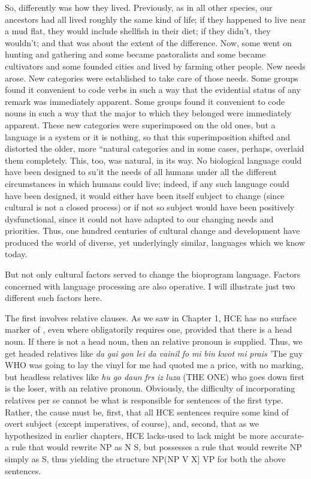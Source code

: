 So, differently was how they lived. Previously, as in all other species, our ancestors had all lived roughly the same kind of life; if they happened to live near a mud flat, they would include shellfish in their diet; if they didn't, they wouldn't; and that was about the extent of the difference. Now, some went on hunting and gathering and some became pastoralists and some became cultivators and some founded cities and lived by farming other people. New needs arose. New cate\-gories were established to take care of those needs. Some groups found it convenient to code verbs in such a way that the evidential status of any remark was immediately apparent. Some groups found it con\-venient to code nouns in such a way that the major 
to which they belonged were immediately apparent. These new cate\-gories were superimposed on the old ones, but a language is a system or it is nothing, so that this superimposition shifted and distorted the older, more ``natural categories and in some cases, perhaps, overlaid them completely. This, too, was natural, in its way. No biological language could have been designed to su'it the needs of all humans under all the different circumstances in which humans could live; indeed, if any such language could have been designed, it would either have been itself subject to change (since cultural  is not a closed process) or if not so subject would have been positively dys\-functional, since it could not have adapted to our changing needs and priorities. Thus, one hundred centuries of cultural change and develop\-ment have produced the world of diverse, yet underlyingly similar, languages which we know today.

But not only cultural factors served to change the bioprogram language. Factors concerned with language processing are also opera\-tive. I will illustrate just two different  such factors here.

The first involves relative clauses. As we saw in Chapter 1, HCE has no surface marker of , even where  obligatorily requires one, provided that there is a head noun. If there is not a head noun, then an  relative pronoun is supplied. Thus, we get headed relatives like \textit{da} \textit{gai} \textit{gon} \textit{lei} \textit{da} \textit{vainil} \textit{fo} \textit{mi} \textit{bin} \textit{kwot} \textit{mi} \textit{prais} 'The guy WHO was going to lay the vinyl for me had quoted me a price, with no marking, but headless relatives like \textit{hu} \textit{go} \textit{daun} \textit{frs} \textit{iz} \textit{luza} (THE ONE) who goes down first is the loser, with an  relative pro\-noun. Obviously, the difficulty of incorporating  relatives per se cannot be what is responsible for sentences of the first type. Rather, the cause must be, first, that all HCE sentences require some kind of overt subject (except imperatives, of course), and, second, that as we hypothesized in earlier chapters, HCE lacks-{\textquotedbl}used to lack might be more accurate-a rule that would rewrite NP as N S, but possesses a rule that would rewrite NP simply as S, thus yielding the structure NP(NP V X] VP for both the above sentences.

